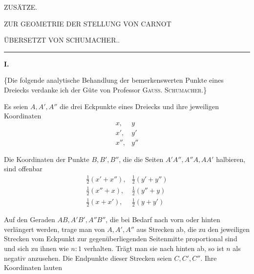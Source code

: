\clearpage
{}
\begin{center}
{\Large ZUSÄTZE.}\par\bigskip
ZUR GEOMETRIE DER STELLUNG VON CARNOT\par\bigskip
ÜBERSETZT VON SCHUMACHER..\par\bigskip
\rule{.1\textwidth}{.3pt}
\end{center}
\par\medskip{}
\centerline{\textbf{I.}}\nobreak\smallskip
\{Die folgende analytische Behandlung der bemerkenswerten Punkte eines Dreiecks verdanke ich der Güte von Professor \textsc{Gauss}. \textsc{Schumacher}.\}

Es seien \(A,A',A''\) die drei Eckpunkte eines Dreiecks und ihre jeweiligen Koordinaten
\[
\begin{array}{ll}
x,&y\\x',&y'\\x'',&y''
\end{array}
\]
\par
Die Koordinaten der Punkte \(B,B',B''\), die die Seiten \(A'A'',A''A,AA'\) halbieren, sind offenbar
\[
\begin{array}{ll}
\tfrac12(x'+x''),&\tfrac12(y'+y'')\\
\tfrac12(x''+x),&\tfrac12(y''+y)\\
\tfrac12(x+x'),&\tfrac12(y+y')
\end{array}
\]
\par
Auf den Geraden \(AB,A'B',A''B''\), die bei Bedarf nach vorn oder hinten verlängert werden, trage man von \(A,A',A''\) aus Strecken ab, die zu den jeweiligen Strecken vom Eckpunkt zur gegenüberliegenden Seitenmitte proportional sind und sich zu ihnen wie \(n:1\) verhalten. Trägt man sie nach hinten ab, so ist \(n\) als negativ anzusehen. Die Endpunkte dieser Strecken seien \(C,C',C''\). Ihre Koordinaten lauten
